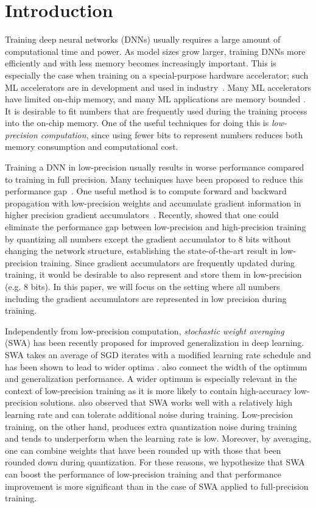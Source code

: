 \documentclass{article}
\begin{document}
\section{Introduction}
Training deep neural networks (DNNs) usually requires a large amount of computational time and power.
As model sizes grow larger, training DNNs more efficiently and with less memory becomes increasingly important.
This is especially the case when training on a special-purpose hardware accelerator; such ML accelerators are in development and used in industry~\cite{jouppi2017datacenter,projectbrainwave}.
Many ML accelerators have limited on-chip memory, and many ML applications are memory bounded \cite{jouppi2017datacenter}.
It is desirable to fit numbers that are frequently used during the training process into the on-chip memory.
One of the useful techniques for doing this is \emph{low-precision computation}, since using fewer bits to represent numbers reduces both memory consumption and computational cost.

Training a DNN in low-precision usually results in worse performance compared to training in full precision.
Many techniques have been proposed to reduce this performance gap~\cite{dorefa-net,WAGE,scalable8bittraining,8bitfloat}.
One useful method is to compute forward and backward propagation with low-precision weights and accumulate gradient information in higher precision gradient accumulators~\cite{binaryconnect, WAGE, 8bitfloat}. 
Recently, \citet{8bitfloat} showed that one could eliminate the performance gap between low-precision and high-precision training by quantizing all numbers except the gradient accumulator to 8 bits without changing the network structure, establishing the state-of-the-art result in low-precision training.
Since gradient accumulators are frequently updated during training, it would be desirable to also represent and store them in low-precision (e.g. 8 bits).
In this paper, we will focus on the setting where all numbers including the gradient accumulators are represented in low precision during training.

Independently from low-precision computation, \emph{stochastic weight averaging} (SWA) \citep{SWA} has been recently proposed for improved generalization in deep learning. 
SWA takes an average of SGD iterates with a modified learning rate schedule and has been shown to lead to wider optima \citep{SWA}.
\citet{large-batch} also connect the width of the optimum and generalization performance.
A wider optimum is especially relevant in the context of low-precision training as it is more likely to contain high-accuracy low-precision solutions.
\citet{SWA} also observed that SWA works well with a relatively high learning rate and can tolerate additional noise during training.
Low-precision training, on the other hand, produces extra quantization noise during training and tends to underperform when the learning rate is low. Moreover, by averaging, one can combine weights that have been rounded up with those that been rounded down during quantization.
For these reasons, we hypothesize that SWA can boost the performance of low-precision training and that performance improvement is more significant than in the case of SWA applied to full-precision training.
\end{document}
